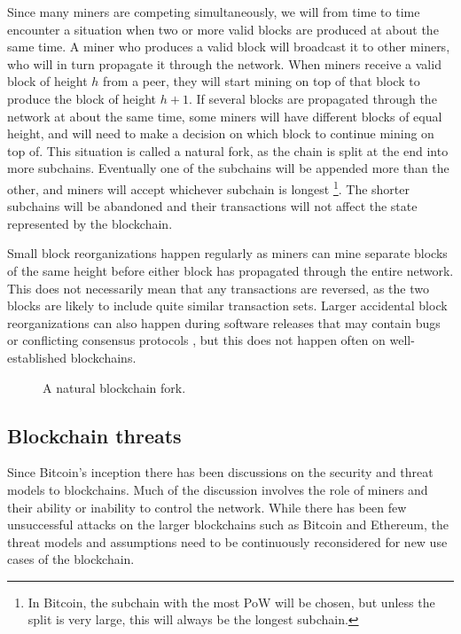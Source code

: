 Since many miners are competing simultaneously, we will from time to time encounter a situation when two or more valid blocks are produced at about the same time. A miner who produces a valid block will broadcast it to other miners, who will in turn propagate it through the network. When miners receive a valid block of height $h$ from a peer, they will start mining on top of that block to produce the block of height $h+1$. If several blocks are propagated through the network at about the same time, some miners will have different blocks of equal height, and will need to make a decision on which block to continue mining on top of. This situation is called a natural fork, as the chain is split at the end into more subchains. Eventually one of the subchains will be appended more than the other, and miners will accept whichever subchain is longest \footnote{In Bitcoin, the subchain with the most PoW will be chosen, but unless the split is very large, this will always be the longest subchain.}. The shorter subchains will be abandoned and their transactions will not affect the state represented by the blockchain.

Small block reorganizations happen regularly as miners can mine separate blocks of the same height before either block has propagated through the entire network. This does not necessarily mean that any transactions are reversed, as the two blocks are likely to include quite similar transaction sets. Larger accidental block reorganizations can also happen during software releases that may contain bugs or conflicting consensus protocols \cite{andresen_march_2013}, but this does not happen often on well-established blockchains.

\begin{figure}[htbp]
  \centering
  
  \caption{A natural blockchain fork.}
  \label{fig:blockchain-fork}
\end{figure}


\subsection{Blockchain threats}

Since Bitcoin's inception there has been discussions on the security and threat models to blockchains. Much of the discussion involves the role of miners and their ability or inability to control the network. While there has been few unsuccessful attacks on the larger blockchains such as Bitcoin and Ethereum, the threat models and assumptions need to be continuously reconsidered for new use cases of the blockchain.

